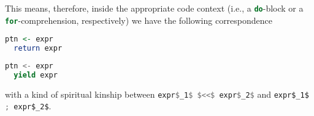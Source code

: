 This means, therefore, inside the appropriate code context (i.e., a
\lstinline[language=Haskell]!do!-block or a
\lstinline[language=Scala]!for!-comprehension, respectively) we have
the following correspondence

\begin{center}
%
\begin{minipage}{2.1764in}
\begin{lstlisting}[language=Haskell,mathescape=true]
  ptn <- expr
  return expr
\end{lstlisting}
\end{minipage}
%
\begin{minipage}{2.1764in}
\begin{lstlisting}[language=Scala,mathescape=true]
  ptn <- expr
  yield expr
\end{lstlisting}
\end{minipage}
%
\end{center}

with a kind of spiritual kinship between \lstinline[language=Haskell,mathescape=true]!expr$_1$ $<<$ expr$_2$! and \lstinline[language=Scala,mathescape=true]!expr$_1$ ; expr$_2$!.


